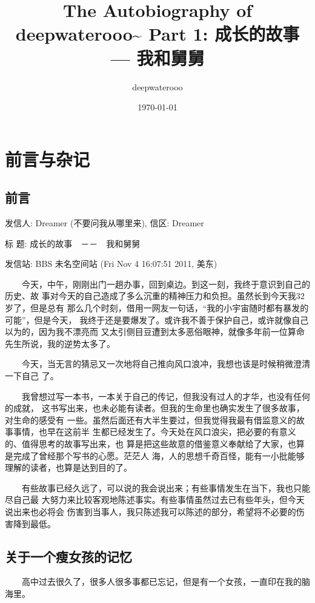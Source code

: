 \documentclass[12pt]{book}
\author{deepwaterooo}
\date{\today}
\title{The Autobiography of deepwaterooo\textasciitilde{} \linebreak Part 1: 成长的故事 --- 我和舅舅}
\begin{document}
\maketitle
\tableofcontents


\chapter{前言与杂记}
\label{sec-1}
\section{前言}
\label{sec-1-1}

发信人: Dreamer (不要问我从哪里来), 信区: Dreamer

标  题: 成长的故事　－－　我和舅舅

发信站: BBS 未名空间站 (Fri Nov  4 16:07:51 2011, 美东)

　　今天，中午，刚刚出门一趟办事，回到桌边。到这一刻，我终于意识到自己的历史、故
事对今天的自己造成了多么沉重的精神压力和负担。虽然长到今天我32岁了，但是总有
那么几个时刻，借用一网友一句话，“我的小宇宙随时都有暴发的可能”，但是今天，
我终于还是要爆发了。或许我不善于保护自己，或许就像自己以为的，因为我不漂亮而
又太引侧目豆遭到太多恶俗眼神，就像多年前一位算命先生所说，我的逆势太多了。

　　今天，当无言的猜忌又一次地将自己推向风口浪冲，我想也该是时候稍微澄清一下自己
了。

　　我曾想过写一本书，一本关于自己的传记，但我没有过人的才华，也没有任何的成就，
这书写出来，也未必能有读者。但我的生命里也确实发生了很多故事，对生命的感受有
一些。虽然后面还有大半生要过，但我觉得我最有借监意义的故事事情，也早在这前半
生都已经发生了。今天处在风口浪尖，把必要的有意义的、值得思考的故事写出来，也
算是把这些故意的借鉴意义奉献给了大家，也算是完成了曾经那个写书的心愿。茫茫人
海，人的思想千奇百怪，能有一小批能够理解的读者，也算是达到目的了。

　　有些故事已经久远了，可以说的我会说出来；有些事情发生在当下，我也只能尽自己最
大努力来比较客观地陈述事实。有些事情虽然过去已有些年头，但今天说出来也必将会
伤害到当事人，我只陈述我可以陈述的部分，希望将不必要的伤害降到最低。

\section{关于一个瘦女孩的记忆　　}
\label{sec-1-2}

　　高中过去很久了，很多人很多事都已忘记，但是有一个女孩，一直印在我的脑海里。
\end{document}
